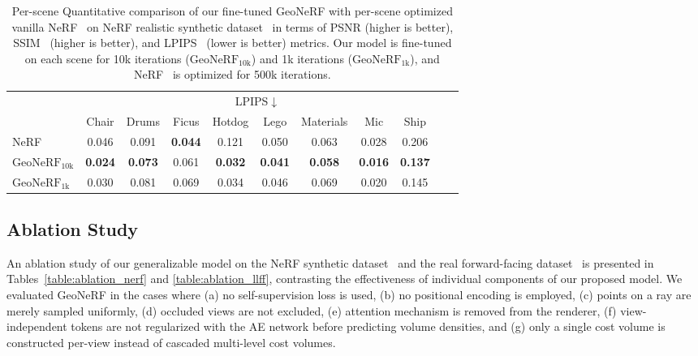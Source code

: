 \begin{table}[!t]
    \begin{center}
        \begin{threeparttable}
            \begin{tabular}{l|cccccccccc}
            & \multicolumn{8}{c}{LPIPS$\downarrow$} \\
            &  Chair & Drums & Ficus & Hotdog & Lego & Materials & Mic & Ship \\
            \hline
            NeRF & 0.046 & 0.091 & \textbf{0.044} & 0.121 & 0.050 & 0.063 & 0.028 & 0.206 \\
            $\text{GeoNeRF}_{\text{10k}}$ & \textbf{0.024} & \textbf{0.073} & 0.061 & \textbf{0.032} & \textbf{0.041} & \textbf{0.058} & \textbf{0.016} & \textbf{0.137} \\
            $\text{GeoNeRF}_{\text{1k}}$ & 0.030 & 0.081 & 0.069 & 0.034 & 0.046 & 0.069 & 0.020 & 0.145 \\            
            \hline
            \end{tabular}
        \end{threeparttable}
    \end{center}
    \vspace{3.0ex}
    \caption{Per-scene Quantitative comparison of our fine-tuned GeoNeRF with per-scene optimized vanilla NeRF~\citep{mildenhall2020nerf} on NeRF realistic synthetic dataset~\citep{mildenhall2020nerf} in terms of PSNR (higher is better), SSIM~\citep{wang2004image} (higher is better), and LPIPS~\citep{zhang2018unreasonable} (lower is better) metrics. Our model is fine-tuned on each scene for 10k iterations ($\text{GeoNeRF}_{\text{10k}}$) and 1k iterations ($\text{GeoNeRF}_{\text{1k}}$), and NeRF~\citep{mildenhall2020nerf} is optimized for 500k iterations.}
    \label{table:per_scene_ft_nerf}
\end{table}

\subsection{Ablation Study} \label{sec:c3_ablation}
An ablation study of our generalizable model on the NeRF synthetic dataset~\citep{mildenhall2020nerf} and the real forward-facing dataset~\citep{mildenhall2019llff} is presented in Tables~\ref{table:ablation_nerf} and \ref{table:ablation_llff}, contrasting the effectiveness of individual components of our proposed model. We evaluated GeoNeRF in the cases where (a) no self-supervision loss is used, (b) no positional encoding is employed, (c) points on a ray are merely sampled uniformly, (d) occluded views are not excluded, (e) attention mechanism is removed from the renderer, (f) view-independent tokens are not regularized with the AE network before predicting volume densities, and (g) only a single cost volume is constructed per-view instead of cascaded multi-level cost volumes.

